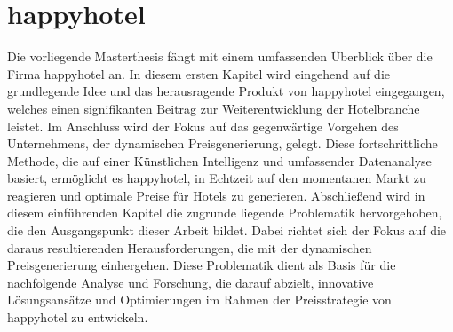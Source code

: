 \section{happyhotel}
\label{sec:happyhotel}
Die vorliegende Masterthesis fängt mit einem umfassenden Überblick über die Firma happyhotel an. In diesem ersten Kapitel wird eingehend auf die grundlegende Idee und das herausragende Produkt von happyhotel eingegangen, welches einen signifikanten Beitrag zur Weiterentwicklung der Hotelbranche leistet.
\newline
\newline
Im Anschluss wird der Fokus auf das gegenwärtige Vorgehen des Unternehmens, der dynamischen Preisgenerierung, gelegt. Diese fortschrittliche Methode, die auf einer Künstlichen Intelligenz und umfassender Datenanalyse basiert, ermöglicht es happyhotel, in Echtzeit auf den momentanen Markt zu reagieren und optimale Preise für Hotels zu generieren.
\newline
\newline
Abschließend wird in diesem einführenden Kapitel die zugrunde liegende Problematik hervorgehoben, die den Ausgangspunkt dieser Arbeit bildet. Dabei richtet sich der Fokus auf die daraus resultierenden Herausforderungen, die mit der dynamischen Preisgenerierung einhergehen. Diese Problematik dient als Basis für die nachfolgende Analyse und Forschung, die darauf abzielt, innovative Lösungsansätze und Optimierungen im Rahmen der Preisstrategie von happyhotel zu entwickeln.




